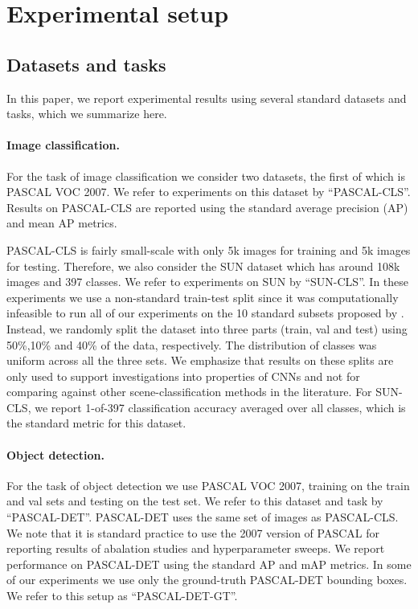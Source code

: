\section{Experimental setup}
\label{sec:train}

\subsection{Datasets and tasks}
In this paper, we report experimental results using several standard datasets and tasks, which we summarize here.

\paragraph{Image classification.} For the task of image classification we consider two datasets, the first of which is PASCAL VOC 2007.
We refer to experiments on this dataset by ``PASCAL-CLS''.
Results on PASCAL-CLS are reported using the standard average precision (AP) and mean AP metrics.

PASCAL-CLS is fairly small-scale with only 5k images for training and 5k images for testing.
Therefore, we also consider the SUN dataset \cite{sun} which has around 108k images and 397 classes.
We refer to experiments on SUN by ``SUN-CLS''.
In these experiments we use a non-standard train-test split since it was computationally infeasible to run all of our experiments on the 10 standard subsets proposed by \cite{sun}. 
Instead, we randomly split the dataset into three parts (train, val and test) using 50\%,10\% and 40\% of the data, respectively. 
The distribution of classes was uniform across all the three sets.
We emphasize that results on these splits are only used to support investigations into properties of CNNs and not for comparing against other scene-classification methods in the literature.
For SUN-CLS, we report 1-of-397 classification accuracy averaged over all classes, which is the standard metric for this dataset.

\paragraph{Object detection.} For the task of object detection we use PASCAL VOC 2007, training on the train and val sets and testing on the test set. 
We refer to this dataset and task by ``PASCAL-DET''.
PASCAL-DET uses the same set of images as PASCAL-CLS.
We note that it is standard practice to use the 2007 version of PASCAL for reporting results of abalation studies and hyperparameter sweeps.
We report performance on PASCAL-DET using the standard AP and mAP metrics.
In some of our experiments we use only the ground-truth PASCAL-DET bounding boxes.
We refer to this setup as ``PASCAL-DET-GT''.

